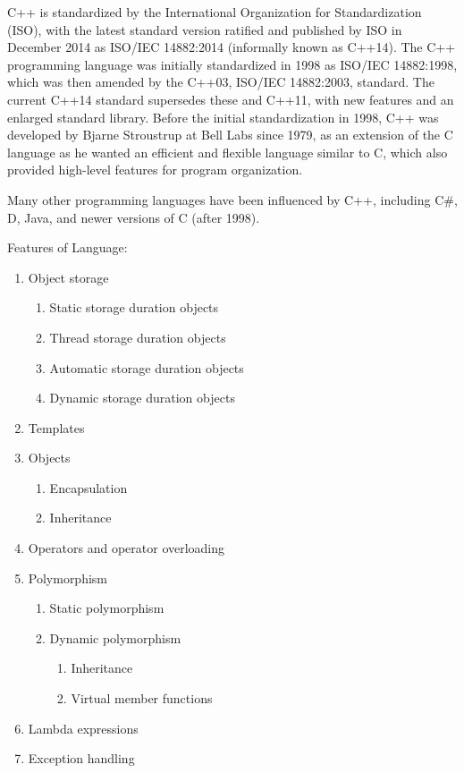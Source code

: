 C++ is standardized by the International Organization for Standardization (ISO), with the latest standard version ratified and published by ISO in December 2014 as ISO/IEC 14882:2014 (informally known as C++14). The C++ programming language was initially standardized in 1998 as ISO/IEC 14882:1998, which was then amended by the C++03, ISO/IEC 14882:2003, standard. The current C++14 standard supersedes these and C++11, with new features and an enlarged standard library. Before the initial standardization in 1998, C++ was developed by Bjarne Stroustrup at Bell Labs since 1979, as an extension of the C language as he wanted an efficient and flexible language similar to C, which also provided high-level features for program organization.

Many other programming languages have been influenced by C++, including C\#, D, Java, and newer versions of C (after 1998).

Features of Language:
\begin{enumerate}
    \item Object storage
    \begin{enumerate}
        \item Static storage duration objects
        \item Thread storage duration objects
        \item Automatic storage duration objects
        \item Dynamic storage duration objects
    \end{enumerate}
    \item Templates
    \item Objects
    \begin{enumerate}
        \item Encapsulation
        \item Inheritance
    \end{enumerate}
    \item Operators and operator overloading
    \item Polymorphism
    \begin{enumerate}
        \item Static polymorphism
        \item Dynamic polymorphism
        \begin{enumerate}
            \item Inheritance
            \item Virtual member functions
        \end{enumerate}
    \end{enumerate}
\item Lambda expressions
\item Exception handling
\end{enumerate}
